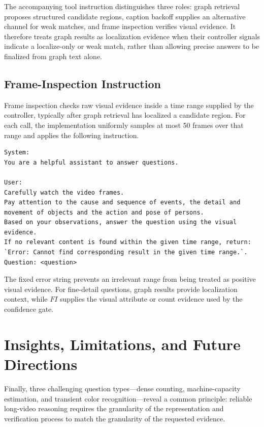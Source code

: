 \documentclass[letterpaper]{article}
\begin{document}
The accompanying tool instruction distinguishes three roles: graph retrieval proposes structured candidate regions, caption backoff supplies an alternative channel for weak matches, and frame inspection verifies visual evidence.
It therefore treats graph results as localization evidence when their controller signals indicate a localize-only or weak match, rather than allowing precise answers to be finalized from graph text alone.

\subsection{Frame-Inspection Instruction}

Frame inspection checks raw visual evidence inside a time range supplied by the controller, typically after graph retrieval has localized a candidate region.
For each call, the implementation uniformly samples at most 50 frames over that range and applies the following instruction.

\begin{lstlisting}
System:
You are a helpful assistant to answer questions.

User:
Carefully watch the video frames.
Pay attention to the cause and sequence of events, the detail and movement of objects and the action and pose of persons.
Based on your observations, answer the question using the visual evidence.
If no relevant content is found within the given time range, return: `Error: Cannot find corresponding result in the given time range.`.
Question: <question>
\end{lstlisting}

The fixed error string prevents an irrelevant range from being treated as positive visual evidence.
For fine-detail questions, graph results provide localization context, while $FI$ supplies the visual attribute or count evidence used by the confidence gate.

\section{Insights, Limitations, and Future Directions}
\label{sec:supp-limitations}

Finally, three challenging question types---dense counting, machine-capacity estimation, and transient color recognition---reveal a common principle: reliable long-video reasoning requires the granularity of the representation and verification process to match the granularity of the requested evidence.
\end{document}
